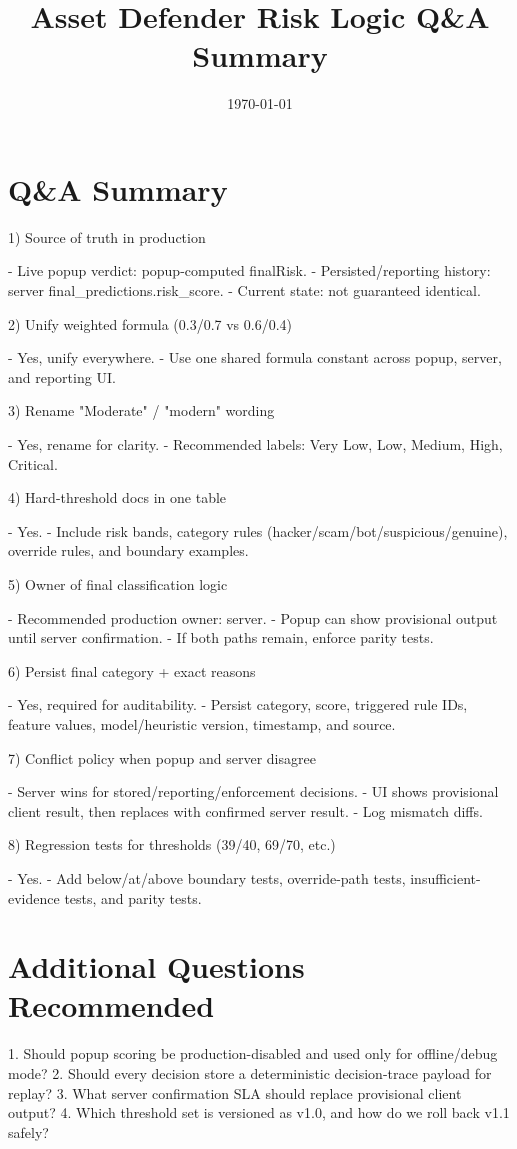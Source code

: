 ﻿\documentclass[12pt]{article}
\title{Asset Defender Risk Logic Q\&A Summary}
\author{}
\date{\today}
\begin{document}
\maketitle

\section*{Q\&A Summary}

1) Source of truth in production

- Live popup verdict: popup-computed finalRisk.
- Persisted/reporting history: server final_predictions.risk_score.
- Current state: not guaranteed identical.

2) Unify weighted formula (0.3/0.7 vs 0.6/0.4)

- Yes, unify everywhere.
- Use one shared formula constant across popup, server, and reporting UI.

3) Rename "Moderate" / "modern" wording

- Yes, rename for clarity.
- Recommended labels: Very Low, Low, Medium, High, Critical.

4) Hard-threshold docs in one table

- Yes.
- Include risk bands, category rules (hacker/scam/bot/suspicious/genuine), override rules, and boundary examples.

5) Owner of final classification logic

- Recommended production owner: server.
- Popup can show provisional output until server confirmation.
- If both paths remain, enforce parity tests.

6) Persist final category + exact reasons

- Yes, required for auditability.
- Persist category, score, triggered rule IDs, feature values, model/heuristic version, timestamp, and source.

7) Conflict policy when popup and server disagree

- Server wins for stored/reporting/enforcement decisions.
- UI shows provisional client result, then replaces with confirmed server result.
- Log mismatch diffs.

8) Regression tests for thresholds (39/40, 69/70, etc.)

- Yes.
- Add below/at/above boundary tests, override-path tests, insufficient-evidence tests, and parity tests.

\section*{Additional Questions Recommended}

1. Should popup scoring be production-disabled and used only for offline/debug mode?
2. Should every decision store a deterministic decision-trace payload for replay?
3. What server confirmation SLA should replace provisional client output?
4. Which threshold set is versioned as v1.0, and how do we roll back v1.1 safely?
\end{document}
